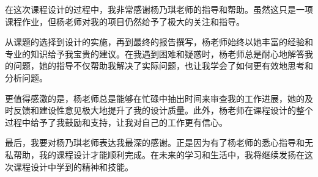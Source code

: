 \acknowledgement
在这次课程设计的过程中，我非常感谢杨乃琪老师的指导和帮助。虽然这只是一项课程作业，但杨老师对我的项目仍然给予了极大的关注和指导。

从课题的选择到设计的实施，再到最终的报告撰写，杨老师始终以她丰富的经验和专业的知识给予我宝贵的建议。在我遇到困难和疑惑时，杨老师总是耐心地解答我的问题，她的指导不仅帮助我解决了实际问题，也让我学会了如何更有效地思考和分析问题。

更值得感激的是，杨老师总是能够在忙碌中抽出时间来审查我的工作进展，她的及时反馈和建设性意见极大地提升了我的设计质量。此外，杨老师在课程设计的整个过程中给予了我鼓励和支持，让我对自己的工作更有信心。

最后，我要对杨乃琪老师表达我最深的感谢。正是因为有了杨老师的悉心指导和无私帮助，我的课程设计才能顺利完成。在未来的学习和生活中，我将继续发扬在这次课程设计中学到的精神和技能。